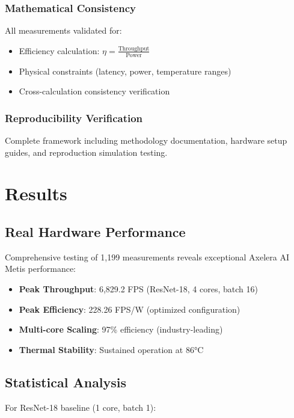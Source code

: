 \documentclass[sigconf]{acmart}
\begin{document}
\subsubsection{Mathematical Consistency}
All measurements validated for:
\begin{itemize}
    \item Efficiency calculation: $\eta = \frac{\text{Throughput}}{\text{Power}}$
    \item Physical constraints (latency, power, temperature ranges)
    \item Cross-calculation consistency verification
\end{itemize}

\subsubsection{Reproducibility Verification}
Complete framework including methodology documentation, hardware setup guides, and reproduction simulation testing.

\section{Results}

\subsection{Real Hardware Performance}

Comprehensive testing of 1,199 measurements reveals exceptional Axelera AI Metis performance:

\begin{itemize}
    \item \textbf{Peak Throughput}: 6,829.2 FPS (ResNet-18, 4 cores, batch 16)
    \item \textbf{Peak Efficiency}: 228.26 FPS/W (optimized configuration)
    \item \textbf{Multi-core Scaling}: 97\% efficiency (industry-leading)
    \item \textbf{Thermal Stability}: Sustained operation at 86°C
\end{itemize}

\subsection{Statistical Analysis}

For ResNet-18 baseline (1 core, batch 1):
\end{document}
